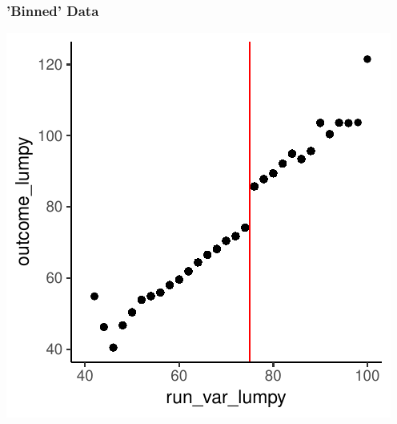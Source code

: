 \documentclass[xcolor=x11names,compress]{beamer}\usepackage[]{graphicx}\usepackage[]{color}
\makeatletter
\def\maxwidth{ %
  \ifdim\Gin@nat@width>\linewidth
    \linewidth
  \else
    \Gin@nat@width
  \fi
}
\newenvironment{knitrout}{}{} %
\renewcommand{\(}{\begin{columns}}
\renewcommand{\)}{\end{columns}}
\newcommand{\<}[1]{\begin{column}{#1}}
\renewcommand{\>}{\end{column}}
\makeatother
\begin{document}
\begin{frame}
\frametitle{'Binned' Data}
\begin{center}
\begin{knitrout}
\color{fgcolor}
\includegraphics[width=\maxwidth]{figure/chart2-1} 

\end{knitrout}
\end{center}
\end{frame}
\end{document}
